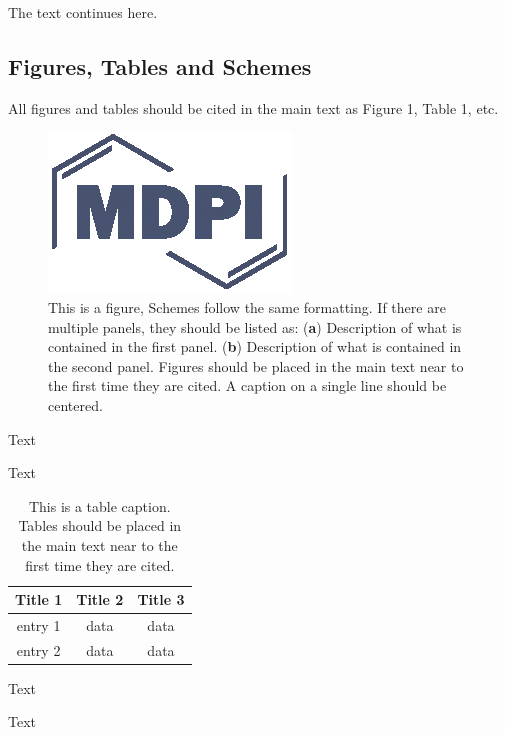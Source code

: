 \documentclass[hydrology,article,submit,moreauthors,pdftex]{Definitions/mdpi}
\begin{document}
The text continues here.

\subsection{Figures, Tables and Schemes}

All figures and tables should be cited in the main text as Figure 1, Table 1, etc.

\begin{figure}[H]
\centering
\includegraphics[width=2 cm]{Definitions/logo-mdpi}
\caption{This is a figure, Schemes follow the same formatting. If there are multiple panels, they should be listed as: (\textbf{a}) Description of what is contained in the first panel. (\textbf{b}) Description of what is contained in the second panel. Figures should be placed in the main text near to the first time they are cited. A caption on a single line should be centered.}
\end{figure}   
 
Text

Text

\begin{table}[H]
\caption{This is a table caption. Tables should be placed in the main text near to the first time they are cited.}
\centering
\begin{tabular}{ccc}
\toprule
\textbf{Title 1}	& \textbf{Title 2}	& \textbf{Title 3}\\
\midrule
entry 1		& data			& data\\
entry 2		& data			& data\\
\bottomrule
\end{tabular}
\end{table}

Text

Text

\end{document}
